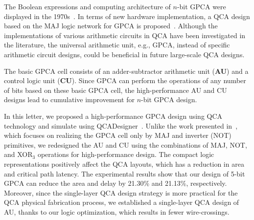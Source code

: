 \documentclass[9pt,journal,compsoc]{IEEEtran}
\begin{document}
The Boolean expressions and computing architecture of $n$-bit GPCA were displayed in the 1970s~\cite{4}.
In terms of new hardware implementation, a QCA design based on the MAJ logic network for GPCA is proposed~\cite{2}.
Although the implementations of various arithmetic circuits in QCA have been investigated in the literature, 
the universal arithmetic unit, e.g., GPCA, instead of specific arithmetic circuit designs, could be beneficial in future large-scale QCA designs.  

The basic GPCA cell consists of an adder-subtractor arithmetic unit (\textbf{AU}) and a control logic unit (\textbf{CU}). 
Since GPCA can perform the operations of any number of bits based on these basic GPCA cell, the high-performance AU and CU designs lead to cumulative improvement for $n$-bit GPCA design. 

In this letter, we proposed a high-performance GPCA design using QCA technology and simulate using QCADesigner~\cite{QCAdesigner}.
Unlike the work presented in~\cite{2}, which focuses on realizing the GPCA cell only by MAJ and inverter (NOT) primitives, we redesigned the AU and CU using the combinations of MAJ, NOT, and XOR$_3$ operations for high-performance design. 
The compact logic representations positively affect the QCA layouts, which has a reduction in area and critical path latency.
The experimental results show that our design of 5-bit GPCA can reduce the area and delay by 21.30\% and 21.13\%, respectively. Moreover, since the single-layer QCA design strategy is more practical for the QCA physical fabrication process, we established a single-layer QCA design of AU, thanks to our logic optimization, which results in fewer wire-crossings.


\end{document}
